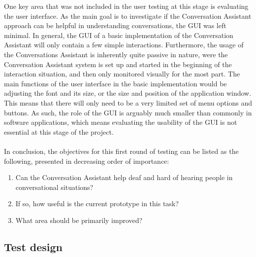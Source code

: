 \documentclass[english, 12pt, a4paper, pdftex, elec, utf8]{aaltothesis}
\begin{document}
One key area that was not included in the user testing at this stage is evaluating the user interface. As the main goal is to investigate if the Conversation Assistant approach can be helpful in understanding conversations, the GUI was left minimal. In general, the GUI of a basic implementation of the Conversation Assistant will only contain a few simple interactions. Furthermore, the usage of the Conversations Assistant is inherently quite passive in nature, were the Conversation Assistant system is set up and started in the beginning of the interaction situation, and then only monitored visually for the most part. The main functions of the user interface in the basic implementation would be adjusting the font and its size, or the size and position of the application window. This means that there will only need to be a very limited set of menu options and buttons. As such, the role of the GUI is arguably much smaller than commonly in software applications, which means evaluating the usability of the GUI is not essential at this stage of the project. \\\\
In conclusion, the objectives for this first round of testing can be listed as the following, presented in decreasing order of importance:
\vspace{1mm}
\begin{enumerate}[itemsep=2mm]
	\item Can the Conversation Assistant help deaf and hard of hearing people in \\ conversational situations?
	\item If so, how useful is the current prototype in this task?
	\item What area should be primarily improved?
\end{enumerate}
\vspace{1mm}

\subsection{Test design} \label{sec:testdesign}
\end{document}
